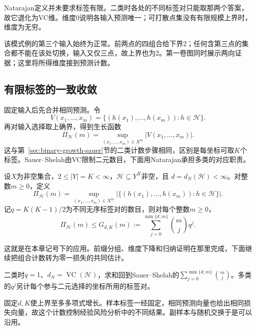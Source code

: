 Natarajan定义并未要求标签有限。二类时各处的不同标签对只能取那两个答案，故它退化为VC维。维度0说明各输入预测唯一；可打散点集没有有限规模上界时，维度为无穷。

该模式例的第三个输入始终为正常。前两点的四组合给下界2；任何含第三点的集合都不能在该处切换，输入又仅三点，故上界也为2。第一卷图同时展示两向证据；这里将所得维度接到预测计数。

\subsection{有限标签的一致收敛}

固定输入后先合并相同预测。令
\[
 V(x_1,\ldots,x_m)
 =\{(h(x_1),\ldots,h(x_m)):h\in\mathcal H\}.
\]
再对输入选择取上确界，得到生长函数
\[
 \Pi_{\mathcal H}(m)=\sup_{(x_1,\ldots,x_m)\in X^m}|V(x_1,\ldots,x_m)|.
\]
这与第~\ref{sec:binary-growth-sauer}节的二类计数步骤相同，区别是每坐标可取$K$个标签。Sauer--Shelah由VC限制二元数目，下面用Natarajan承担多类的对应职责。

\begin{theorem}[有限标签的预测数目上界]
\label{thm:learning-multiclass-growth-bound}
设$X$为非空集合，$2\leq|Y|=K<\infty$，$\mathcal H\subseteq Y^X$非空，且
$d=d_N(\mathcal H)<\infty$。对整数$m\geq0$，定义
\[
 \Pi_{\mathcal H}(m)
 =\sup_{(x_1,\ldots,x_m)\in X^m}
 \left|\{(h(x_1),\ldots,h(x_m)):h\in\mathcal H\}\right|.
\]
记$q=K(K-1)/2$为不同无序标签对的数目，则对每个整数$m\geq0$，
\[
 \Pi_{\mathcal H}(m)\leq G_{d,K}(m)
 :=\sum_{j=0}^{\min\{d,m\}}\binom mj q^j.
\]
\end{theorem}

这就是在本章记号下的应用。前缀分组、维度下降和归纳证明在那里完成，下面继续把组合计数转为零一损失的共同估计。

二类时$q=1$、$d_N=\operatorname{VC}(\mathcal H)$，求和回到Sauer--Shelah的$\sum_{j=0}^{\min\{d,m\}}\binom mj$。多类的$q^j$另计每个参与二元选择的坐标所用的标签对。

固定$d,K$使上界至多多项式增长。样本标签一经固定，相同预测向量也给出相同损失向量，故这个计数控制经验风险分析中的不同结果。副样本与随机交换于是可以沿用。

